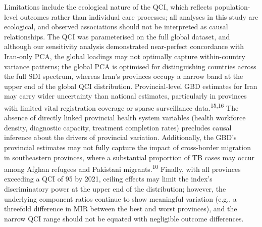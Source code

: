 \documentclass[12pt]{article}
\begin{document}
Limitations include the ecological nature of the QCI, which reflects population-level outcomes rather than individual care processes; all analyses in this study are ecological, and observed associations should not be interpreted as causal relationships. The QCI was parameterised on the full global dataset, and although our sensitivity analysis demonstrated near-perfect concordance with Iran-only PCA, the global loadings may not optimally capture within-country variance patterns; the global PCA is optimised for distinguishing countries across the full SDI spectrum, whereas Iran's provinces occupy a narrow band at the upper end of the global QCI distribution. Provincial-level GBD estimates for Iran may carry wider uncertainty than national estimates, particularly in provinces with limited vital registration coverage or sparse surveillance data.\textsuperscript{15,16} The absence of directly linked provincial health system variables (health workforce density, diagnostic capacity, treatment completion rates) precludes causal inference about the drivers of provincial variation. Additionally, the GBD's provincial estimates may not fully capture the impact of cross-border migration in southeastern provinces, where a substantial proportion of TB cases may occur among Afghan refugees and Pakistani migrants.\textsuperscript{10} Finally, with all provinces exceeding a QCI of 95 by 2021, ceiling effects may limit the index's discriminatory power at the upper end of the distribution; however, the underlying component ratios continue to show meaningful variation (e.g., a threefold difference in MIR between the best and worst provinces), and the narrow QCI range should not be equated with negligible outcome differences.
\end{document}
